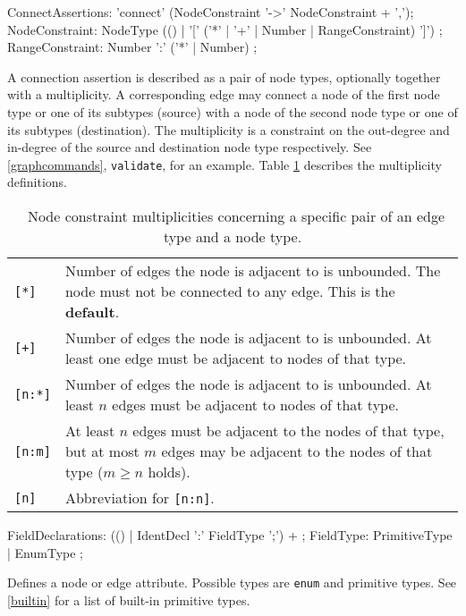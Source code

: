 \begin{rail}  
  ConnectAssertions: 'connect' (NodeConstraint '->' NodeConstraint + ',');
  NodeConstraint: NodeType (() | '[' ('*' | '+' | Number | RangeConstraint) ']') ;
  RangeConstraint: Number ':' ('*' | Number) ;
\end{rail}
A connection assertion is described as a pair of node types, optionally together with a multiplicity. A corresponding edge may connect a node of the first node type or one of its subtypes (source) with a node of the second node type or one of its subtypes (destination). The multiplicity is a constraint on the out-degree and in-degree of the source and destination node type respectively. See \ref{graphcommands}, \texttt{validate}, for an example. Table \ref{multiplicities} describes the multiplicity definitions.
\begin{table}[htbp]
\begin{tabularx}{\linewidth}{|l|X|}\hline
	\texttt{[*]} & Number of edges the node is adjacent to is unbounded. The node must not be connected to any edge. This is the \textbf{default}.\\
	\texttt{[+]} & Number of edges the node is adjacent to is unbounded. At least one edge must be adjacent to nodes of that type.\\
	\texttt{[n:*]} & Number of edges the node is adjacent to is unbounded. At least $n$ edges must be adjacent to nodes of that type.\\ 
	\texttt{[n:m]} & At least $n$ edges must be adjacent to the nodes of that type, but at most $m$ edges may be adjacent to the nodes of that type ($m \geq n$ holds).\\
	\texttt{[n]} & Abbreviation for \texttt{[n:n]}. \\ \hline
\end{tabularx}
\caption{\GrG\ Node constraint multiplicities concerning a specific pair of an edge type and a node type.}
\label{multiplicities}
\end{table}

\begin{rail}    
  FieldDeclarations: (() | IdentDecl ':' FieldType ';') + ;
  FieldType: PrimitiveType | EnumType ; 
\end{rail}
Defines a node or edge attribute. Possible types are \texttt{enum} and primitive types. See \ref{builtin} for a list of built-in primitive types.
